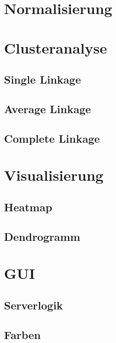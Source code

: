 \documentclass[12pt]{article}
\begin{document}
\newpage
\pagestyle{fancy}
\fancyhead{}
\section{Normalisierung}
\label{normalisierung}


\section{Clusteranalyse}
\label{clusteranalyse}


\subsection{Single Linkage}
\label{single-linkage}

\subsection{Average Linkage}
\label{average-linkage}

\subsection{Complete Linkage}
\label{complete-linkage}

\newpage
\pagestyle{fancy}
\fancyhead{}
\section{Visualisierung}
\label{visualisierung}

\subsection{Heatmap}
\label{heatmap}

\subsection{Dendrogramm}
\label{dendrogramm}

\newpage
\pagestyle{fancy}
\fancyhead{}
\section{GUI}
\label{gui}

\subsection{Serverlogik}
\label{serverlogik}


\newpage
\pagestyle{fancy}
\fancyhead{}
\subsection{Farben}
\end{document}
